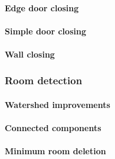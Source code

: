 \paragraph{Edge door closing}
\paragraph{Simple door closing}
\paragraph{Wall closing}
\subsubsection{Room detection}
\paragraph{Watershed improvements}
\paragraph{Connected components}
\paragraph{Minimum room deletion}


